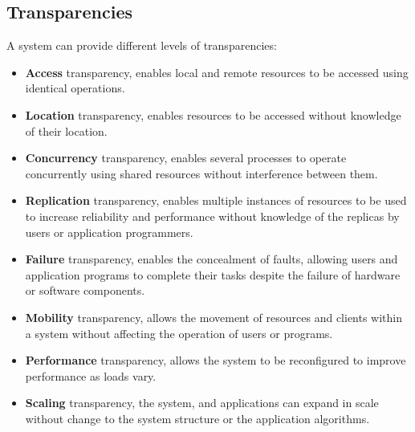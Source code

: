 \subsection{Transparencies}
A system can provide different levels of transparencies:
\begin{itemize}
    \item \textbf{Access} transparency, enables local and remote resources to be accessed using identical operations.
    \item \textbf{Location} transparency, enables resources to be accessed without knowledge of their location.
    \item \textbf{Concurrency} transparency, enables several processes to operate concurrently using shared resources without interference between them. 
    \item \textbf{Replication} transparency, enables multiple instances of resources to be used to increase reliability and performance without knowledge of the replicas by users or application programmers.
    \item \textbf{Failure} transparency, enables the concealment of faults, allowing users and application programs to complete their tasks despite the failure of hardware or software components.
    \item \textbf{Mobility} transparency, allows the movement of resources and clients within a system without affecting the operation of users or programs.
    \item \textbf{Performance} transparency, allows the system to be reconfigured to improve performance as loads vary.
    \item \textbf{Scaling} transparency, the system, and applications can expand in scale without change to the system structure or the application algorithms.
\end{itemize}

